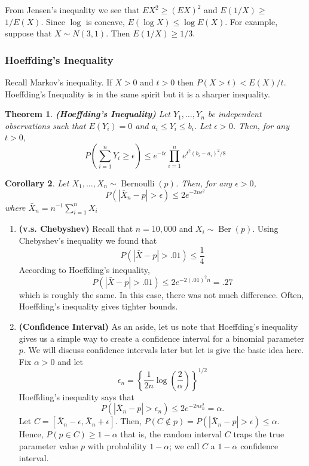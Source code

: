 \documentclass[13pt]{article}
\newtheorem{theorem}{Theorem}[section]
\newtheorem{corollary}[theorem]{Corollary}
\theoremstyle{definition}
\theoremstyle{remark}
\newenvironment{remark}
  {\pushQED{\qed}\renewcommand{\qedsymbol}{$\triangle$}\remarkx}
  {\popQED\endremarkx}
\begin{document}
\begin{remark}
    From Jensen's inequality we see that $E X^{2} \geq(E X)^{2}$ and $E(1 / X) \geq$ $1 / E(X)$. Since $\log$ is concave, $E(\log X) \leq \log E(X)$. For example, suppose that $X \sim N(3,1)$. Then $E(1 / X) \geq 1 / 3$.
\end{remark}

\subsubsection{Hoeffding's Inequality}
Recall Markov's inequality. If $X>0$ and $t>0$ then $P(X>t)<E(X) / t$. Hoeffding's Inequality is in the same spirit but it is a sharper inequality. 

\begin{theorem}\textbf{(Hoeffding's Inequality)} Let $Y_{1}, \ldots, Y_{n}$ be independent observations such that $E\left(Y_{i}\right)=0$ and $a_{i} \leq Y_{i} \leq b_{i}$. Let $\epsilon>0$. Then, for any $t>0$,
$$
P\left(\sum_{i=1}^{n} Y_{i} \geq \epsilon\right) \leq e^{-t \epsilon} \prod_{i=1}^{n} e^{t^{2}\left(b_{i}-a_{i}\right)^{2} / 8}
$$
\end{theorem}

\begin{corollary}Let $X_{1}, \ldots, X_{n} \sim \operatorname{Bernoulli}(p)$. Then, for any $\epsilon>0$,
$$
P\left(\left|\bar{X}_{n}-p\right|>\epsilon\right) \leq 2 e^{-2 n \epsilon^{2}}
$$
where $\bar{X}_{n}=n^{-1} \sum_{i=1}^{n} X_{i}$
\end{corollary}
\begin{remark}\hfill

\begin{enumerate}
    \item \textbf{(v.s. Chebyshev)} Recall that $n=10,000$ and $X_{i} \sim \operatorname{Ber}(p)$. Using Chebyshev's inequality we found that
$$
P(|\bar{X}-p|>.01) \leq \frac{1}{4}
$$
According to Hoeffding's inequality,
$$
P(|\bar{X}-p|>.01) \leq 2 e^{-2(.01)^{2} n}=.27
$$
which is roughly the same. In this case, there was not much difference. Often, Hoeffding's inequality gives tighter bounds. 
\item \textbf{(Confidence Interval)} As an aside, let us note that Hoeffding's inequality gives us a simple way to create a confidence interval for a binomial parameter $p$. We will discuss confidence intervals later but let is give the basic idea here. Fix $\alpha>0$ and let
$$
\epsilon_{n}=\left\{\frac{1}{2 n} \log \left(\frac{2}{\alpha}\right)\right\}^{1 / 2}
$$
Hoeffding's inequality says that
$$
P\left(\left|\bar{X}_{n}-p\right|>\epsilon_{n}\right) \leq 2 e^{-2 n \epsilon_{n}^{2}}=\alpha .
$$
Let $C=\left[\bar{X}_{n}-\epsilon, \bar{X}_{n}+\epsilon\right]$. Then, $P(C \notin p)=P\left(\left|\bar{X}_{n}-p\right|>\epsilon\right) \leq \alpha$. Hence, $P(p \in C) \geq 1-\alpha$ that is, the random interval $C$ traps the true parameter value $p$ with probability $1-\alpha$; we call $C$ a $1-\alpha$ confidence interval. 
\end{enumerate}
\end{remark}
\end{document}
